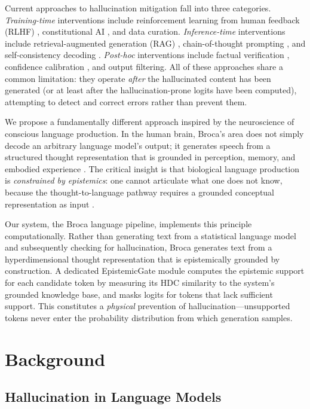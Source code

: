 \documentclass[12pt,a4paper]{article}
\begin{document}
Current approaches to hallucination mitigation fall into three categories. \emph{Training-time} interventions include reinforcement learning from human feedback (RLHF) \citep{ouyang2022training}, constitutional AI \citep{bai2022constitutional}, and data curation. \emph{Inference-time} interventions include retrieval-augmented generation (RAG) \citep{lewis2020retrieval}, chain-of-thought prompting \citep{wei2022chain}, and self-consistency decoding \citep{wang2023selfconsistency}. \emph{Post-hoc} interventions include factual verification \citep{thorne2018fever}, confidence calibration \citep{kadavath2022language}, and output filtering. All of these approaches share a common limitation: they operate \emph{after} the hallucinated content has been generated (or at least after the hallucination-prone logits have been computed), attempting to detect and correct errors rather than prevent them.

We propose a fundamentally different approach inspired by the neuroscience of conscious language production. In the human brain, Broca's area does not simply decode an arbitrary language model's output; it generates speech from a structured thought representation that is grounded in perception, memory, and embodied experience \citep{hagoort2005broca, fedorenko2014role}. The critical insight is that biological language production is \emph{constrained by epistemics}: one cannot articulate what one does not know, because the thought-to-language pathway requires a grounded conceptual representation as input \citep{levelt1989speaking}.

Our system, the Broca language pipeline, implements this principle computationally. Rather than generating text from a statistical language model and subsequently checking for hallucination, Broca generates text from a hyperdimensional thought representation that is epistemically grounded by construction. A dedicated EpistemicGate module computes the epistemic support for each candidate token by measuring its HDC similarity to the system's grounded knowledge base, and masks logits for tokens that lack sufficient support. This constitutes a \emph{physical} prevention of hallucination---unsupported tokens never enter the probability distribution from which generation samples.

\section{Background}

\subsection{Hallucination in Language Models}
\end{document}
